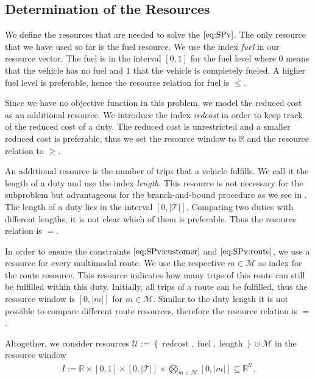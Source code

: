 
\subsection{Determination of the Resources}
\label{sec:resources}

We define the resources that are needed to solve the $\eqref{eq:SPv}$. The only resource that we have used so far is the fuel resource. We use the index \emph{fuel} in our resource vector. The fuel is in the interval $[0,1]$ for the fuel level where $0$ means that the vehicle has no fuel and $1$ that the vehicle is completely fueled. A higher fuel level is preferable, hence the resource relation for fuel is $\leq$.

Since we have no objective function in this problem, we model the reduced cost as an additional resource. We introduce the index \emph{redcost} in order to keep track of the reduced cost of a duty. The reduced cost is unrestricted and a smaller reduced cost is preferable, thus we set the resource window to $\mathbb{R}$ and the resource relation to $\geq$.

An additional resource is the number of trips that a vehicle fulfills. We call it the length of a duty and use the index \emph{length}. This resource is not necessary for the subproblem but advantageous for the branch-and-bound procedure as we see in . The length of a duty lies in the interval $[0,|\mathcal{T}|]$. Comparing two duties with different lengths, it is not clear which of them is preferable. Thus the resource relation is $=$.

In order to ensure the constraints $\eqref{eq:SPv:customer}$ and $\eqref{eq:SPv:route}$, we use a resource for every multimodal route. We use the respective $m\in\mathcal{M}$ as index for the route resource. This resource indicates how many trips of this route can still be fulfilled within this duty. Initially, all trips of a route can be fulfilled, thus the resource window is $[0,|m|]$ for $m\in\mathcal{M}$. Similar to the duty length it is not possible to compare different route resources, therefore the resource relation is $=$.

Altogether, we consider resources ${\mathcal{U} := \left\{\operatorname{redcost},\operatorname{fuel},\operatorname{length}\right\}\cupdot\mathcal{M}}$ in the resource window
\begin{align*}
	I := \mathbb{R}\times[0,1]\times[0,|\mathcal{T}|]\times\bigotimes_{m\in\mathcal{M}}[0,|m|]\subseteq\mathbb{R}^{\mathcal{U}}.
\end{align*}


